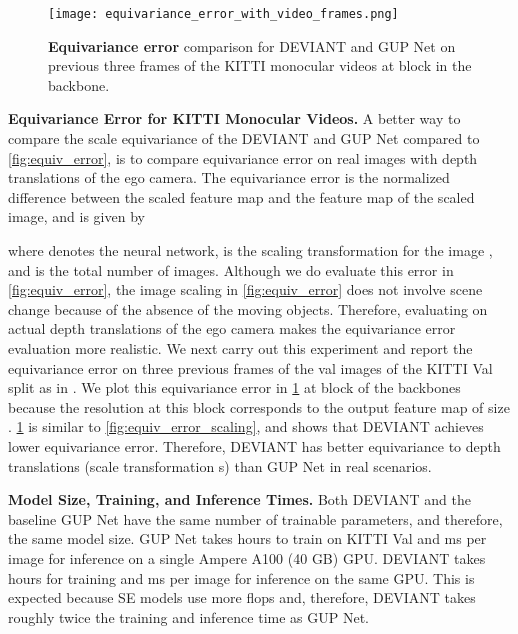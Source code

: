 \documentclass[runningheads]{llncs}
\newcommand{\equivariance}{equivariance}
\newcommand{\Equivariance}{Equivariance}
\newcommand{\se}{SE}
\newcommand{\transformation}{transformation}
\newcommand{\kitti}{KITTI}
\newcommand{\valOne}{Val}
\newcommand{\gupNet}{GUP Net}
\newcommand{\noIndentHeading}[1]{\noindent\textbf{#1}}
\newcommand{\methodName}{DEVIANT}
\begin{document}
        \begin{figure}[!tb]
            \centering
            \texttt{[image: equivariance\_error\_with\_video\_frames.png]}
            \caption{\textbf{\Equivariance{} error } comparison for \methodName{} and \gupNet{} on previous three frames of the \kitti{} monocular videos at block  in the backbone.}
            \label{fig:equiv_error_mono_videos}
        \end{figure}


\noIndentHeading{\Equivariance{} Error for \kitti{} Monocular Videos.}
            A better way to compare the scale \equivariance{} of the \methodName{} and \gupNet{} \cite{lu2021geometry} compared to \cref{fig:equiv_error}, is to compare \equivariance{} error on real images with depth translations of the ego camera.
            The \equivariance{} error  is the normalized difference between the scaled feature map and the feature map of the scaled image, and is given by
            
            where  denotes the neural network,  is the scaling transformation for the image , and  is the total number of images.
            Although we do evaluate this error in \cref{fig:equiv_error}, the image scaling in \cref{fig:equiv_error} does not involve scene change because of the absence of the moving objects.
            Therefore, evaluating on actual depth translations of the ego camera makes the \equivariance{} error evaluation more realistic.
            We next carry out this experiment and report the \equivariance{} error on three previous frames of the val images of the \kitti{} \valOne{} split as in \cite{brazil2020kinematic}.
            We plot this \equivariance{} error in \cref{fig:equiv_error_mono_videos} at block  of the backbones because the resolution at this block corresponds to the output feature map of size .
            \cref{fig:equiv_error_mono_videos} is similar to \cref{fig:equiv_error_scaling}, and shows that \methodName{} achieves lower \equivariance{} error.
            Therefore, \methodName{} has better \equivariance{} to depth translations (scale \transformation{} s) than \gupNet{}\cite{lu2021geometry} in real scenarios.

\noIndentHeading{Model Size, Training, and Inference Times.}
            Both \methodName{} and the baseline \gupNet{} have the same number of trainable parameters, and therefore, the same model size. 
            \gupNet{} takes  hours to train on \kitti{} \valOne{} and  ms per image for inference on a single Ampere A100 (40 GB) GPU.
            \methodName{} takes  hours for training and  ms per image for inference on the same GPU.
            This is expected because \se{} models use more flops \cite{zhu2019scale, sosnovik2020sesn} and, therefore, \methodName{} takes roughly twice the training and inference time as \gupNet.
\end{document}
